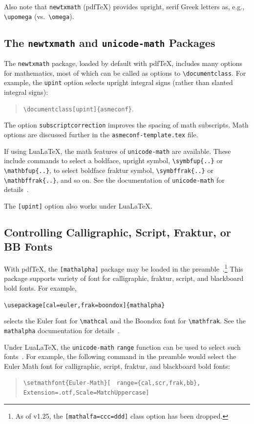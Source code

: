 \documentclass[balance,nocopyright,upint,varvw,hyphenate,barcolor=Goldenrod3,german]{asmejour}%
\newcommand*\pdfTeX{pdf\TeX}
\newcommand*\LuaLaTeX{Lua\LaTeX}
\begin{document}
Also note that \texttt{newtxmath} (\pdfTeX) provides upright, serif Greek letters as, e.g., \verb|\upomega| (vs.\ \verb|\omega|).

\subsection{The \texttt{newtxmath} and \texttt{unicode-math} Packages~\cite{sharpe1,robertson2023}} The \texttt{newtxmath} package, loaded by default with \pdfTeX, includes many options for mathematics, most of which can be called as options to \verb|\documentclass|. For example, the \texttt{upint} option selects upright integral signs (rather than slanted integral signs):
\begin{quote}
\verb|\documentclass[upint]{asmeconf}|.
\end{quote}
The option \verb|subscriptcorrection| improves the spacing of math subscripts. Math options are discussed further in the \texttt{asmeconf-template.tex} file.

If using \LuaLaTeX, the math features of \texttt{unicode-math} are available.  These include commands to select a boldface, upright symbol, \verb|\symbfup{..}| or \verb|\mathbfup{..}|, to select boldface fraktur symbol, \verb|\symbffrak{..}| or \verb|\mathbffrak{..}|, and so on.  See the documentation of \texttt{unicode-math} for details~\cite{robertson2023}.

The \texttt{[upint]} option also works under \LuaLaTeX.


\subsection{Controlling Calligraphic, Script, Fraktur, or BB Fonts}
With \pdfTeX, the \texttt{[mathalpha]} package may be loaded in the preamble~\cite{sharpe2}.\footnote{As of v1.25, the \texttt{[mathalfa=ccc=ddd]} class option has been dropped.} This package supports variety of font for calligraphic, fraktur, script, and blackboard bold fonts. For example,
\begin{center}
\verb|\usepackage[cal=euler,frak=boondox]{mathalpha}|
\end{center}
selects the Euler font for \verb|\mathcal| and the Boondox font for \verb|\mathfrak|. See the \texttt{mathalpha} documentation for details~\cite{sharpe2}.

Under \LuaLaTeX, the \texttt{unicode-math} \texttt{range} function can be used to select such fonts~\cite{robertson2023}. For example, the following command in the preamble would select the Euler Math font for calligraphic, script, fraktur, and blackboard bold fonts:
\begin{quote}\raggedright
\verb|\setmathfont{Euler-Math}[|
\verb| range={cal,scr,frak,bb},|
\verb| Extension=.otf,Scale=MatchUppercase]|
\end{quote}
\end{document}
